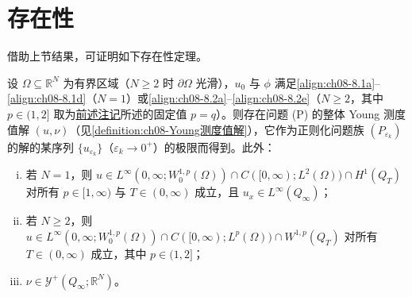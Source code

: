 \documentclass[../../main.tex]{subfiles}%
\begin{document}
\section{存在性}\label{section:ch08-存在性}

借助上节结果，可证明如下存在性定理。

\begin{theorem}\label{theorem:ch08-存在性}
设 $\Omega\subseteq\mathbb{R}^N$ 为有界区域（$N\geqslant2$ 时 $\partial\Omega$ 光滑），$u_0$ 与 $\phi$ 满足\eqref{align:ch08-8.1a}--\eqref{align:ch08-8.1d}（$N=1$）或\eqref{align:ch08-8.2a}--\eqref{align:ch08-8.2e}（$N\geqslant2$，其中 $p\in(1,2]$ 取为\hyperref[remark:ch08-8.1.1]{前述注记}所述的固定值 $p=q$）。则存在问题 (P) 的整体 Young 测度值解 $(u,\nu)$（见\cref{definition:ch08-Young测度值解}），它作为正则化问题族 $(P_{\varepsilon_k})$ 的解的某序列 $\{u_{\varepsilon_k}\}$（$\varepsilon_k\to0^+$）的极限而得到。此外：
\begin{enumerate}[(i)]
\item\label{item:ch08-exist-i} 若 $N=1$，则 $u\in L^\infty(0,\infty;W^{1,p}_0(\Omega))\cap C([0,\infty);L^2(\Omega))\cap H^1(Q_T)$ 对所有 $p\in[1,\infty)$ 与 $T\in(0,\infty)$ 成立，且 $u_x\in L^\infty(Q_\infty)$；
\item\label{item:ch08-exist-ii} 若 $N\geqslant2$，则 $u\in L^\infty(0,\infty;W^{1,p}_0(\Omega))\cap C([0,\infty);L^p(\Omega))\cap W^{1,p}(Q_T)$ 对所有 $T\in(0,\infty)$ 成立，其中 $p\in(1,2]$；
\item\label{item:ch08-exist-iii} $\nu\in\mathcal{Y}^+(Q_\infty;\mathbb{R}^N)$。
\end{enumerate}
\end{theorem}
\end{document}
